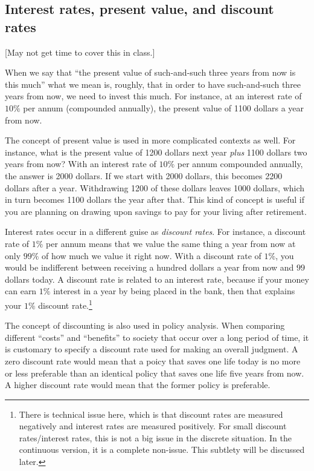 \documentclass{amsart}
\begin{document}
\subsection{Interest rates, present value, and discount rates}

[May not get time to cover this in class.]

When we say that ``the present value of such-and-such three years from
now is this much'' what we mean is, roughly, that in order to have
such-and-such three years from now, we need to invest this much. For
instance, at an interest rate of $10\%$ per annum (compounded
annually), the present value of 1100 dollars a year from now.

The concept of present value is used in more complicated contexts as
well. For instance, what is the present value of 1200 dollars next
year {\em plus} 1100 dollars two years from now? With an interest rate
of $10\%$ per annum compounded annually, the answer is 2000
dollars. If we start with 2000 dollars, this becomes 2200 dollars
after a year. Withdrawing 1200 of these dollars leaves 1000 dollars,
which in turn becomes 1100 dollars the year after that. This kind of
concept is useful if you are planning on drawing upon savings to pay
for your living after retirement.

Interest rates occur in a different guise as {\em discount rates}. For
instance, a discount rate of $1\%$ per annum means that we value the
same thing a year from now at only $99\%$ of how much we value it
right now. With a discount rate of $1\%$, you would be indifferent
between receiving a hundred dollars a year from now and $99$ dollars
today. A discount rate is related to an interest rate, because if your
money can earn $1\%$ interest in a year by being placed in the bank,
then that explains your $1\%$ discount rate.\footnote{There is
technical issue here, which is that discount rates are measured
negatively and interest rates are measured positively. For small
discount rates/interest rates, this is not a big issue in the discrete
situation. In the continuous version, it is a complete non-issue. This
subtlety will be discussed later.}

The concept of discounting is also used in policy analysis. When
comparing different ``costs'' and ``benefits'' to society that occur
over a long period of time, it is customary to specify a discount rate
used for making an overall judgment. A zero discount rate would mean
that a poicy that saves one life today is no more or less preferable
than an identical policy that saves one life five years from now. A
higher discount rate would mean that the former policy is preferable.
\end{document}
